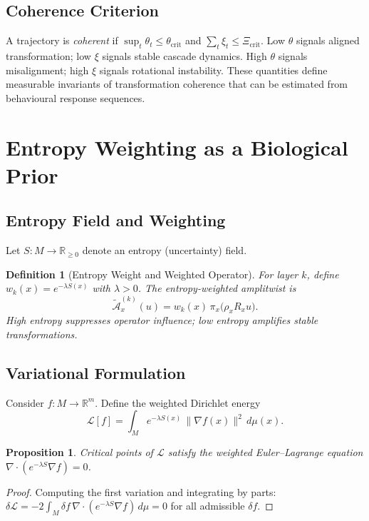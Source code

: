 \documentclass[12pt, a4paper]{article}
\newtheorem{definition}[theorem]{Definition}
\newtheorem{proposition}[theorem]{Proposition}
\theoremstyle{remark}
\theoremstyle{definition}
\begin{document}
\subsection{Coherence Criterion}

A trajectory is \emph{coherent} if $\sup_t \theta_t \le \theta_{\mathrm{crit}}$ and
$\sum_t \xi_t \le \Xi_{\mathrm{crit}}$.  Low $\theta$ signals aligned transformation; low
$\xi$ signals stable cascade dynamics.  High $\theta$ signals misalignment; high $\xi$
signals rotational instability.  These quantities define measurable invariants of
transformation coherence that can be estimated from behavioural response sequences.

\section{Entropy Weighting as a Biological Prior}
\label{app:entropy}

\subsection{Entropy Field and Weighting}

Let $S \colon M \to \mathbb{R}_{\ge 0}$ denote an entropy (uncertainty) field.

\begin{definition}[Entropy Weight and Weighted Operator]
For layer $k$, define $w_k(x) = e^{-\lambda S(x)}$ with $\lambda > 0$.  The
entropy-weighted amplitwist is
\[
\widetilde{\mathcal{A}}^{(k)}_x(u)
= w_k(x)\,\pi_x\!\bigl(\rho_x R_x u\bigr).
\]
High entropy suppresses operator influence; low entropy amplifies stable transformations.
\end{definition}

\subsection{Variational Formulation}

Consider $f \colon M \to \mathbb{R}^m$.  Define the weighted Dirichlet energy
\[
\mathcal{L}[f]
= \int_M e^{-\lambda S(x)}\,\|\nabla f(x)\|^2\,d\mu(x).
\]

\begin{proposition}
Critical points of $\mathcal{L}$ satisfy the weighted Euler--Lagrange equation
$\nabla\cdot(e^{-\lambda S}\nabla f) = 0$.
\end{proposition}

\begin{proof}
Computing the first variation and integrating by parts:
$\delta\mathcal{L} = -2\int_M \delta f\,\nabla\cdot(e^{-\lambda S}\nabla f)\,d\mu = 0$
for all admissible $\delta f$.
\end{proof}
\end{document}
